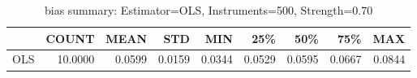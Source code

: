 \begin{table}[ht]
\centering
\caption{bias summary: Estimator=OLS, Instruments=500, Strength=0.70}
\begin{tabular}{lrrrrrrrr}
\toprule
 & COUNT & MEAN & STD & MIN & 25\% & 50\% & 75\% & MAX \\
\midrule
OLS & 10.0000 & 0.0599 & 0.0159 & 0.0344 & 0.0529 & 0.0595 & 0.0667 & 0.0844 \\
\bottomrule
\end{tabular}
\end{table}
